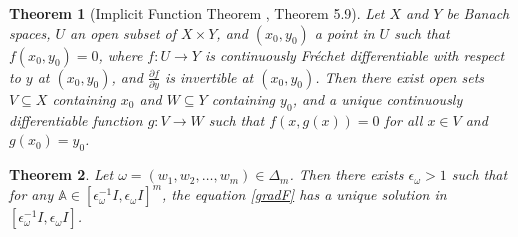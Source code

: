 \documentclass[12pt,reqno]{amsart}
\newtheorem{theorem}{Theorem}[section]
\begin{document}
\begin{theorem} [Implicit Function Theorem \cite{L-b}, Theorem 5.9]
Let $X$ and $Y$ be Banach spaces, $U$ an open subset of $X \times Y$, and $(x_0, y_0)$ a point in $U$ such that $f(x_0, y_0) = 0$, where $f : U \rightarrow Y$ is continuously Fréchet differentiable with respect to $y$ at $(x_0, y_0)$, and $\frac{\partial f}{\partial y}$ is invertible at $(x_0, y_0)$.
Then there exist open sets $V \subseteq X$ containing $x_0$ and $W \subseteq Y$ containing $y_0$, and a unique continuously differentiable function $g : V \rightarrow W$ such that $f(x, g(x)) = 0$ for all $x \in V$ and $g(x_0) = y_0$.
\end{theorem}


\begin{theorem} \label{T:Wass-epsilon}
Let $\omega = (w_{1}, w_{2}, \dots, w_{m}) \in \Delta_{m}$. Then there exists $\epsilon_{\omega} > 1$ such that for any $\mathbb{A} \in [\epsilon_{\omega}^{-1} I, \epsilon_{\omega} I]^m$, the equation \eqref{gradF} has a unique solution in $[\epsilon_{\omega}^{-1} I, \epsilon_{\omega} I]$.
\end{theorem}
\end{document}
